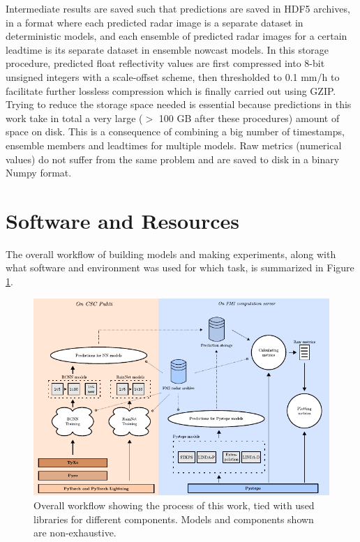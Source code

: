 Intermediate results are saved such that predictions are saved in HDF5 archives, in a format where each predicted radar image is a separate dataset in deterministic models, and each ensemble of predicted radar images for a certain leadtime is its separate dataset in ensemble nowcast models. In this storage procedure, predicted float reflectivity values are first compressed into 8-bit unsigned integers with a scale-offset scheme, then thresholded to 0.1 mm/h to facilitate further lossless compression which is finally carried out using GZIP. Trying to reduce the storage space needed is essential because predictions in this work take in total a very large ($>$ 100 GB after these procedures) amount of space on disk. This is a consequence of combining a big number of timestamps, ensemble members and leadtimes for multiple models. Raw metrics (numerical values) do not suffer from the same problem and are saved to disk in a binary Numpy format.  

\section{Software and Resources}

\label{section:software}

The overall workflow of building models and making experiments, along with what software and environment was used for which task, is summarized in Figure \ref{fig:workflow}.

\begin{figure}[ht]
	\centering
	\includegraphics[width=\textwidth]{images/workflow/workflow}
	\caption{Overall workflow showing the process of this work, tied with used libraries for different components. Models and components shown are non-exhaustive.}
	\label{fig:workflow}
\end{figure}

